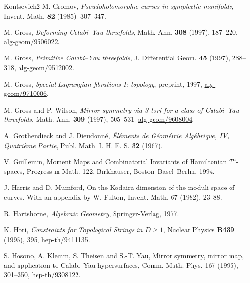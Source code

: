 \begin{thebibliography}{Kontsevich2}
\hypertarget{bib:Gromov}{} M. Gromov, \emph{Pseudoholomorphic curves in symplectic manifolds}, Invent. Math. \textbf{82} (1985), 307--347.

\hypertarget{bib:Gross1}{} M. Gross, \emph{Deforming Calabi--Yau threefolds}, Math. Ann. \textbf{308} (1997), 187--220, \href{https://arxiv.org/abs/alg-geom/9506022}{alg-geom/9506022}.

\hypertarget{bib:Gross2}{} M. Gross, \emph{Primitive Calabi--Yau threefolds}, J. Differential Geom. \textbf{45} (1997), 288--318, \href{https://arxiv.org/abs/alg-geom/9512002}{alg-geom/9512002}.

\hypertarget{bib:Gross3}{} M. Gross, \emph{Special Lagrangian fibrations I: topology}, preprint, 1997, \href{https://arxiv.org/abs/alg-geom/9710006}{alg-geom/9710006}.

\hypertarget{bib:GW}{} M. Gross and P. Wilson, \emph{Mirror symmetry via 3-tori for a class of Calabi--Yau threefolds}, Math. Ann. \textbf{309} (1997), 505--531, \href{https://arxiv.org/abs/alg-geom/9608004}{alg-geom/9608004}.

\hypertarget{bib:GD}{} A. Grothendieck and J. Dieudonné, \emph{Éléments de Géométrie Algébrique, IV, Quatrième Partie}, Publ. Math. I. H. E. S. \textbf{32} (1967).

\hypertarget{bib:Guillemin}{}
V. Guillemin, Moment Maps and Combinatorial Invariants of Hamiltonian
$T^n$-spaces, Progress in Math. 122, Birkhäuser, Boston--Basel--Berlin, 1994.

\hypertarget{bib:HM}{}
J. Harris and D. Mumford, On the Kodaira dimension of the moduli space of curves. With an appendix by W. Fulton, Invent. Math. 67 (1982), 23--88.

\hypertarget{bib:Hartshorne}{} R. Hartshorne, \emph{Algebraic Geometry}, Springer-Verlag, 1977.

\hypertarget{bib:Hori}{}
K. Hori, \emph{Constraints for Topological Strings in $D\geq1$}, Nuclear Physics \textbf{B439} (1995), 395, \href{https://arxiv.org/abs/hep-th/9411135}{hep-th/9411135}.

\hypertarget{bib:HKTY1}{}
S. Hosono, A. Klemm, S. Theisen and S.-T. Yau,
Mirror symmetry, mirror map, and application to Calabi--Yau hypersurfaces,
Comm. Math. Phys. 167 (1995), 301--350, \href{https://arxiv.org/abs/hep-th/9308122}{hep-th/9308122}.


\end{thebibliography}
